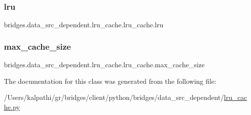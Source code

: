 \subsubsection{\texorpdfstring{lru}{lru}}
{\footnotesize\ttfamily bridges.\+data\+\_\+src\+\_\+dependent.\+lru\+\_\+cache.\+lru\+\_\+cache.\+lru}

\mbox{\label{classbridges_1_1data__src__dependent_1_1lru__cache_1_1lru__cache_a87a170ed62886de32e1bbf0d9ac05cfd}} 
\subsubsection{\texorpdfstring{max\+\_\+cache\+\_\+size}{max\_cache\_size}}
{\footnotesize\ttfamily bridges.\+data\+\_\+src\+\_\+dependent.\+lru\+\_\+cache.\+lru\+\_\+cache.\+max\+\_\+cache\+\_\+size}



The documentation for this class was generated from the following file\+:\begin{DoxyCompactItemize}
\item 
/\+Users/kalpathi/gr/bridges/client/python/bridges/data\+\_\+src\+\_\+dependent/\mbox{\hyperlink{lru__cache_8py}{lru\+\_\+cache.\+py}}\end{DoxyCompactItemize}
